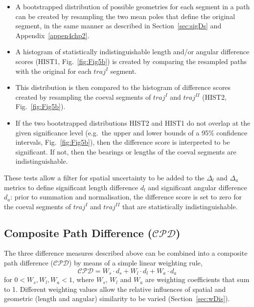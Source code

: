 \begin{itemize}
\item A bootstrapped distribution of possible geometries for each segment in a
  path can be created by resampling the two mean poles that define the original
  segment, in the same manner as described in Section~\ref{sec:sigDs} and
  Appendix~\ref{appen4chp2}.
\item A histogram of statistically indistinguishable length and/or angular
  difference scores (HIST1, Fig.~\ref{fig:Fig5b}) is created by comparing the
  resampled paths with the original for each $traj^I$ segment.
\item This distribution is then compared to the histogram of difference scores
  created by resampling the coeval segments of $traj^I$ and $traj^{II}$ (HIST2,
  Fig.~\ref{fig:Fig5b}).
\item If the two bootstrapped distributions HIST2 and HIST1 do not overlap at
  the given significance level (e.g.\ the upper and lower bounds of a 95\%
  confidence intervals, Fig.~\ref{fig:Fig5b}), then the difference score is
  interpreted to be significant. If not, then the bearings or lengths of the
  coeval segments are indistinguishable.
\end{itemize}

These tests allow a filter for spatial uncertainty to be added to the $\Delta_l$
and $\Delta_a$ metrics to define significant length difference $d_l$ and
significant angular difference $d_a$: prior to summation and normalisation, the
difference score is set to zero for the coeval segments of $traj^I$ and
$traj^{II}$ that are statistically indistinguishable.

\subsection{Composite Path Difference ($\mathcal{CPD}$)}

The three difference measures described above can be combined into a composite
path difference ($\mathcal{CPD}$) by means of a simple linear weighting rule,
%
\begin{equation*}
\mathcal{CPD} = W_s \cdot d_s + W_l \cdot d_l + W_a \cdot d_a
\label{eq:cpd}
\end{equation*}
%
for $0 < W_s,W_l,W_a < 1$, where $W_s$, $W_l$ and $W_a$ are weighting
coefficients that sum to 1. Different weighting values allow the relative
influences of spatial and geometric (length and angular) similarity to be
varied (Section~\ref{sec:wDis}).

